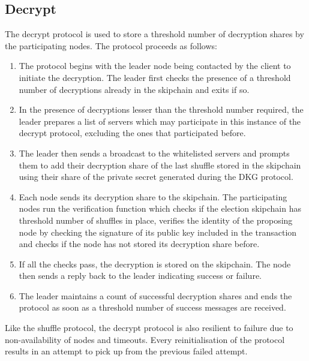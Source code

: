\subsection{Decrypt}

The decrypt protocol is used to store a threshold number of decryption shares by the participating nodes. The protocol proceeds as follows:

\begin{enumerate}
  \item The protocol begins with the leader node being contacted by the client to initiate the decryption. The leader first checks the presence of a threshold number of decryptions already in the skipchain and exits if so.
  \item In the presence of decryptions lesser than the threshold number required, the leader prepares a list of servers which may participate in this instance of the decrypt protocol, excluding the ones that participated before.
  \item The leader then sends a broadcast to the whitelisted servers and prompts them to add their decryption share of the last shuffle stored in the skipchain using their share of the private secret generated during the DKG protocol.
  \item Each node sends its decryption share to the skipchain. The participating nodes run the verification function which checks if the election skipchain has threshold number of shuffles in place, verifies the identity of the proposing node by checking the signature of its public key included in the transaction and checks if the node has not stored its decryption share before.
  \item If all the checks pass, the decryption is stored on the skipchain. The node then sends a reply back to the leader indicating success or failure.
  \item The leader maintains a count of successful decryption shares and ends the protocol as soon as a threshold number of success messages are received.
 \end{enumerate}
 
 Like the shuffle protocol, the decrypt protocol is also resilient to failure due to non-availability of nodes and timeouts. Every reinitialisation of the protocol results in an attempt to pick up from the previous failed attempt.
